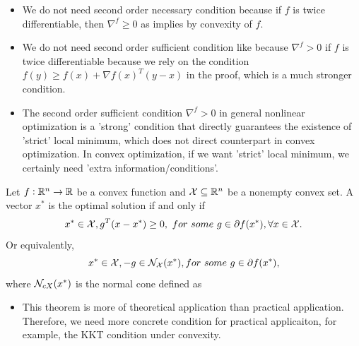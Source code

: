 \begin{refsection}
\begin{remark}\hfill
\begin{itemize}
    \item We do not need second order necessary condition because if $f$ is twice differentiable, then $\nabla^f \geq 0$ as implies by convexity of $f$.
    \item We do not need second order sufficient condition like because $\nabla^f > 0$ if $f$ is twice differentiable because we rely on the condition $f(y) \geq f(x) +\nabla f(x)^T(y-x)$ in the proof, which is a much stronger condition.
    \item The second order sufficient condition $\nabla^f > 0$ in general nonlinear optimization is a 'strong' condition that directly guarantees the existence of 'strict' local minimum, which does not direct counterpart in convex optimization. In convex optimization, if we want 'strict' local minimum, we certainly need 'extra information/conditions'. 
\end{itemize}
\end{remark}


\begin{theorem}
Let $f:\mathbb{R}^n\to \mathbb{R}$ be a convex function and $\mathcal{X} \subseteq \mathbb{R}^n$ be a nonempty convex set. A vector $x^*$ is the optimal solution if and only if
$$x^*\in \mathcal{X}, g^T(x-x^*)\geq 0, ~for~some~g\in \partial f(x^*), \forall x\in \mathcal{X}.$$
Or equivalently, 
$$x^*\in \mathcal{X}, -g \in \mathcal{N}_{\mathcal{X}}(x^*), for~some~ g\in \partial f(x^*),$$
where $\mathcal{N}_{cX}(x^*)$ is the normal cone defined as
\end{theorem}




\begin{remark}[interpretation]\hfill
\begin{itemize}
	\item This theorem is more of theoretical application than practical application. Therefore, we need more concrete condition for practical applicaiton, for example, the KKT condition under convexity.
\end{itemize}
\end{remark}



\end{refsection}
